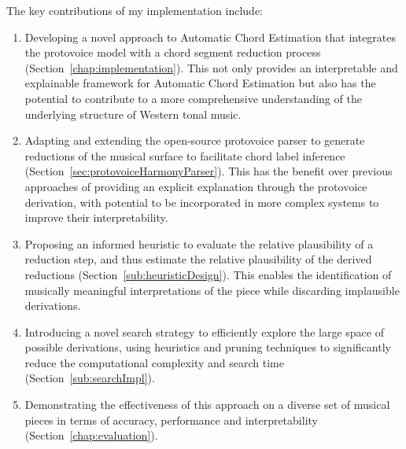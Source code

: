 \documentclass[12pt,a4paper,twoside,openany]{report} \usepackage[pdfborder={0 0 0}]{hyperref}    %
\theoremstyle{definition} \newtheorem{definition}{Definition}[section]
\begin{document}
    The key contributions of my implementation include:
    \begin{enumerate}
      \item Developing a novel approach to Automatic Chord Estimation that integrates the protovoice model with
        a chord segment reduction process (Section~\ref{chap:implementation}). This not only provides an interpretable and explainable
        framework for Automatic Chord Estimation but also has the potential to contribute to a more comprehensive understanding of the underlying structure of Western tonal music.
      \item Adapting and extending the open-source protovoice parser to generate reductions of the musical surface
        to facilitate chord label inference (Section~\ref{sec:protovoiceHarmonyParser}). This has the benefit over previous approaches of providing
        an explicit explanation through the protovoice derivation, with potential to be incorporated in more complex
        systems to improve their interpretability.
      \item Proposing an informed heuristic to evaluate the relative plausibility of a reduction step, and thus
        estimate the relative plausibility of the derived reductions (Section~\ref{sub:heuristicDesign}). This enables the identification of musically
        meaningful interpretations of the piece while discarding implausible derivations. 
      \item Introducing a novel search strategy to efficiently explore the large space of possible derivations,
        using heuristics and pruning techniques to significantly reduce the computational complexity and search
        time (Section~\ref{sub:searchImpl}). 
      \item Demonstrating the effectiveness of this approach on a diverse set of musical pieces in terms of
        accuracy, performance and interpretability (Section~\ref{chap:evaluation}). 
    \end{enumerate}
\end{document}
